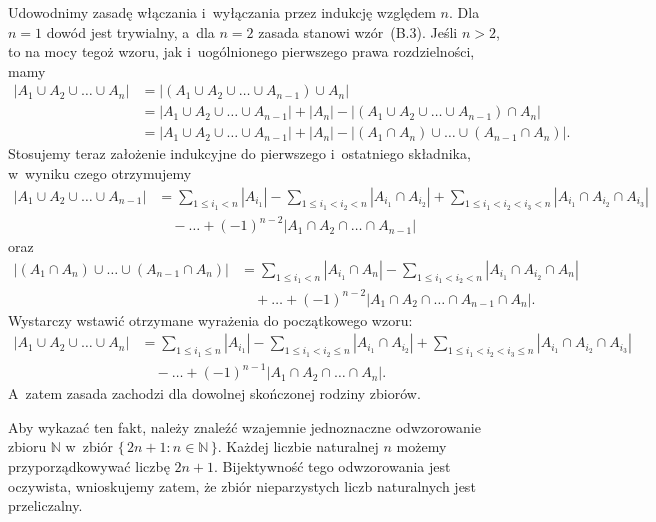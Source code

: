 \exercise %
Udowodnimy zasadę włączania i~wyłączania przez indukcję względem $n$. Dla $n=1$ dowód jest trywialny, a~dla $n=2$ zasada stanowi wzór~(B.3). Jeśli $n>2$, to na mocy tegoż wzoru, jak i~uogólnionego pierwszego prawa rozdzielności, mamy
\begin{align*}
    |A_1\cup A_2\cup\dots\cup A_n| &= \bigl|(A_1\cup A_2\cup\dots\cup A_{n-1})\cup A_n\bigr| \\
	&= |A_1\cup A_2\cup\dots\cup A_{n-1}|+|A_n|-\bigl|(A_1\cup A_2\cup\dots\cup A_{n-1})\cap A_n\bigr| \\
	&= |A_1\cup A_2\cup\dots\cup A_{n-1}|+|A_n|-\bigl|(A_1\cap A_n)\cup\dots\cup(A_{n-1}\cap A_n)\bigr|.
\end{align*}
Stosujemy teraz założenie indukcyjne do pierwszego i~ostatniego składnika, w~wyniku czego otrzymujemy
\begin{align*}
	|A_1\cup A_2\cup\dots\cup A_{n-1}| &= \sum_{1\le i_1<n}|A_{i_1}|-\sum_{1\le i_1<i_2<n}|A_{i_1}\cap A_{i_2}|+\sum_{1\le i_1<i_2<i_3<n}|A_{i_1}\cap A_{i_2}\cap A_{i_3}| \\[1mm]
	&\quad {}-\dots+(-1)^{n-2}|A_1\cap A_2\cap\dots\cap A_{n-1}|
\end{align*}
oraz
\begin{align*}
	\bigl|(A_1\cap A_n)\cup\dots\cup(A_{n-1}\cap A_n)\bigr| &= \sum_{1\le i_1<n}|A_{i_1}\cap A_n|-\sum_{1\le i_1<i_2<n}|A_{i_1}\cap A_{i_2}\cap A_n|\\[1mm]
	&\quad {}+\dots+(-1)^{n-2}|A_1\cap A_2\cap\dots\cap A_{n-1}\cap A_n|.
\end{align*}
Wystarczy wstawić otrzymane wyrażenia do początkowego wzoru:
\begin{align*}
	|A_1\cup A_2\cup\dots\cup A_n| &= \sum_{1\le i_1\le n}|A_{i_1}|-\sum_{1\le i_1<i_2\le n}|A_{i_1}\cap A_{i_2}|+\sum_{1\le i_1<i_2<i_3\le n}|A_{i_1}\cap A_{i_2}\cap A_{i_3}| \\[1mm]
	&\quad {}-\dots+(-1)^{n-1}|A_1\cap A_2\cap\dots\cap A_n|.
\end{align*}
A~zatem zasada zachodzi dla dowolnej skończonej rodziny zbiorów.

\exercise %

\noindent Aby wykazać ten fakt, należy znaleźć wzajemnie jednoznaczne odwzorowanie zbioru $\mathbb{N}$ w~zbiór $\bigl\{\,2n+1:n\in\mathbb{N}\,\bigr\}$. Każdej liczbie naturalnej $n$ możemy przyporządkowywać liczbę $2n+1$. Bijektywność tego odwzorowania jest oczywista, wnioskujemy zatem, że zbiór nieparzystych liczb naturalnych jest przeliczalny.

